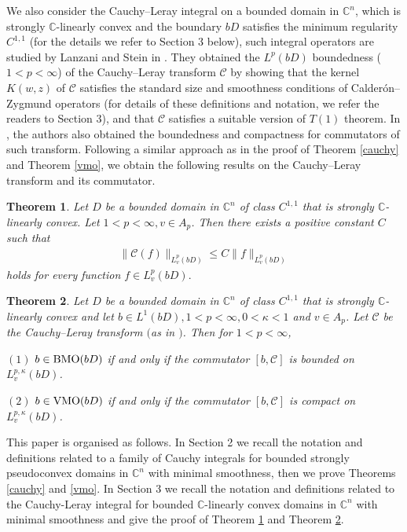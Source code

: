 \documentclass[11pt,a4paper]{amsart}
\numberwithin{equation}{section}
\newtheorem{theorem}{Theorem}[section]
\def\C{\mathbb C}
\begin{document}
We also consider the Cauchy--Leray integral on a bounded domain in $\mathbb C^n$, which is strongly $\C$-linearly convex  and the boundary $bD$ satisfies the minimum regularity $C^{1,1}$  (for the details we refer to Section 3 below), such integral operators are studied by Lanzani and Stein in \cite{LS2014}.
They obtained the $L^p(bD)$ boundedness ($1<p<\infty$) of the  Cauchy--Leray transform $\mathcal C$ by showing that the kernel $K(w,z)$ of $\mathcal C$ satisfies the standard size and smoothness conditions of Calder\'on--Zygmund operators (for details of these definitions and notation, we refer the readers to Section 3), and
that  $\mathcal C$ satisfies a  suitable version of $T(1)$ theorem.  In \cite{DLLWW}, the authors also obtained the  boundedness and compactness for commutators of such transform.
Following a similar approach as in the proof of Theorem \ref{cauchy} and Theorem \ref{vmo}, we obtain the following results on  the Cauchy--Leray transform and its commutator.

\begin{theorem}\label{weight1}
Let $D$ be a bounded domain in $\mathbb C^n$ of class $C^{1,1}$ that is strongly $\mathbb C$-linearly convex. Let $1<p<\infty, v\in A_p$.  Then there exists a positive constant $C$ such that
\begin{align}\label{th1}
\|\mathcal C(f)\|_{L_{v}^{p}(bD)}\leq C \|f\|_{L_{v}^{p}(bD)}
\end{align}
holds for every function $f\in L_{v}^{p}(bD).$
\end{theorem}


\begin{theorem}\label{Cauchy-Leray}
Let $D$ be a bounded domain in $\mathbb C^n$ of class $C^{1,1}$ that is strongly $\mathbb C$-linearly convex and let $b\in L^1(bD),  1<p<\infty,  0<\kappa<1$ and $v\in A_p$.
Let $\mathcal C$ be the Cauchy--Leray transform $($as in \cite{LS2014}$)$. Then for $1<p<\infty$,

$(1)$  $b\in{\rm BMO}(bD)$ if and only if
the commutator $[b, \mathcal C]$ is bounded on  $L_{v}^{p, \kappa}(bD)$.

$(2)$  $b\in{\rm VMO}(bD)$ if and only if
the commutator $[b, \mathcal C]$ is compact on  $L_{v}^{p, \kappa}(bD)$.
\end{theorem}

\color{black}

This paper is organised as follows.  In Section 2 we recall the notation and definitions related to a family of Cauchy integrals for bounded strongly pseudoconvex domains in $\C^n$ with minimal smoothness, then we prove Theorems \ref{cauchy} and \ref{vmo}.
 In Section 3 we recall the notation and definitions related to the Cauchy-Leray integral for bounded $\C$-linearly convex domains in $\mathbb C^n$ with minimal smoothness and give the proof of Theorem \ref{weight1} and Theorem \ref{Cauchy-Leray}.
\end{document}
